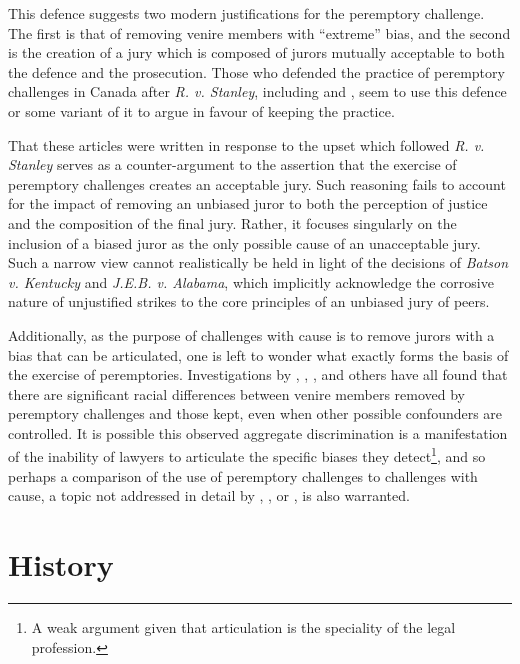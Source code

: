 This defence suggests two modern justifications for the peremptory challenge. The first is that of removing venire members with
``extreme'' bias, and the second is the creation of a jury which is composed of jurors mutually acceptable to both the defence and
the prosecution. Those who defended the practice of peremptory
challenges in Canada after \textit{R. v. Stanley}, including
\cite{peremparegood} and \cite{macnabproper}, seem to use this defence or some variant of it to argue in favour of keeping the
practice.

That these articles were written in response to the upset which followed \textit{R. v. Stanley} serves as a counter-argument to
the assertion that the exercise of peremptory challenges creates an acceptable jury. Such reasoning fails to account for the
impact of removing an unbiased juror to both the perception of justice and the composition of the final jury. Rather, it focuses
singularly on the inclusion of a biased juror as the only possible cause of an unacceptable jury. Such a narrow view cannot
realistically be held in light of the decisions of \textit{Batson v. Kentucky} and \textit{J.E.B. v. Alabama}, which implicitly
acknowledge the corrosive nature of unjustified strikes to the core principles of an unbiased jury of peers.

Additionally, as the purpose of challenges with cause is to remove jurors with a bias that can be articulated, one is left to
wonder what exactly forms the basis of the exercise of peremptories. Investigations by
\cite{PerempChalMurder}, \cite{JurySunshineProj}, \cite{StubbornLegacy}, and others have all found that there are significant
racial differences between venire members removed by peremptory challenges and those kept, even when other possible confounders
are controlled. It is possible this observed aggregate discrimination is a manifestation of the inability of lawyers to
articulate the specific biases they detect\footnote{A weak argument given that articulation is the speciality of the legal
  profession.}, and so perhaps a comparison of the use of peremptory challenges to challenges with cause, a topic not addressed in
detail by \cite{PerempChalMurder}, \cite{JurySunshineProj}, or \cite{StubbornLegacy}, is also warranted.

\section{History} \label{sec:history}

